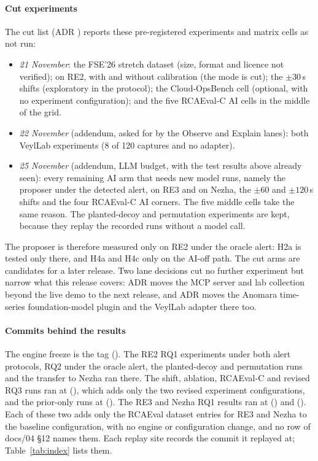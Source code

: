 \paragraph{Cut experiments}
The cut list (ADR \allowbreak{}) reports these pre-registered experiments and matrix cells as not run:
\begin{itemize}
\item \emph{21 November}: the FSE'26 stretch dataset (size, format and licence not verified); \allowbreak{} on RE2, with and without calibration (the  mode is cut); the $\pm 30$\,s  shifts (exploratory in the protocol); the Cloud-OpsBench  cell (optional, with no experiment configuration); and the five RCAEval-C AI cells in the middle of the grid.
\item \emph{22 November} (addendum, asked for by the Observe and Explain lanes): both VeylLab experiments (8 of 120 captures and no adapter).
\item \emph{25 November} (addendum, LLM budget, with the test results above already seen): every remaining AI arm that needs new model runs, namely the proposer under the detected alert, on RE3 and on Nezha, the $\pm 60$ and $\pm 120$\,s  shifts and the four RCAEval-C AI corners. The five middle cells take the same reason. The planted-decoy and permutation experiments are kept, because they replay the recorded  runs without a model call.
\end{itemize}
The proposer is therefore measured only on RE2 under the oracle alert: H2a is tested only there, and H4a and H4c only on the AI-off path.
The cut arms are candidates for a later release.
Two lane decisions cut no further experiment but narrow what this release covers: ADR \allowbreak{} moves the MCP server and lab collection beyond the live demo to the next release, and ADR \allowbreak{} moves the Anomara time-series foundation-model plugin and the VeylLab adapter there too.

\paragraph{Commits behind the results}
The engine freeze is the tag  ().
The RE2 RQ1 experiments under both alert protocols, RQ2 under the oracle alert, the planted-decoy and permutation runs and the transfer to Nezha ran there.
The shift, ablation, RCAEval-C and revised RQ3 runs ran at \allowbreak{} (), which adds only the two revised experiment configurations, and the prior-only runs at \allowbreak{} ().
The RE3 and Nezha RQ1 results ran at \allowbreak{} () and \allowbreak{} ().
Each of these two adds only the RCAEval dataset entries for RE3 and Nezha to the baseline configuration, with no engine or configuration change, and no row of docs/04 §12 names them.
Each replay site records the commit it replayed at; Table~\ref{tab:index} lists them.

